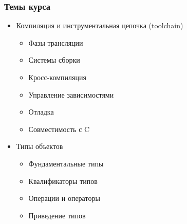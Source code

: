 \documentclass[compress, aspectratio=169]{beamer}
\subtitle{Введение}
\begin{document}
\frame[plain]{\titlepage}

\begin{frame}

    \frametitle{Темы курса}

    \begin{itemize}

        \item Компиляция и инструментальная цепочка (toolchain)

            \begin{itemize}

                \item Фазы трансляции

                \item Системы сборки

                \item Кросс-компиляция

                \item Управление зависимостями

                \item Отладка

                \item Совместимость с C

            \end{itemize}

        \item Типы объектов

            \begin{itemize}

                \item Фундаментальные типы

                \item Квалификаторы типов

                \item Операции и операторы

                \item Приведение типов

            \end{itemize}

    \end{itemize}

\end{frame}
\end{document}
